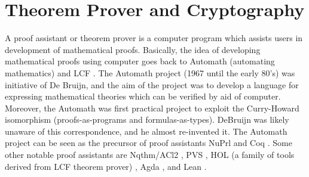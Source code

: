 \chapter{Theorem Prover and Cryptography}
\label{cha:theorem_crypto}
 

A proof assistant or theorem prover is a computer program which assists users in development 
of mathematical proofs. Basically, the idea of 
developing mathematical proofs using computer goes back to Automath (automating mathematics)
\citep{deBruijn1983} and LCF \citep{Milner:1972:IAS:942578.807067}. The 
Automath project (1967 until the early 80's)  was initiative of De Bruijn, and the aim of the project was to 
develop a language for expressing mathematical theories which can be verified by aid of computer.  
Moreover, the Automath was first 
practical project to exploit the Curry-Howard isomorphism (proofs-as-programs and formulas-as-types). 
DeBruijn  was likely unaware of this correspondence, and he almost re-invented it.
The Automath project can be seen as the precursor of
 proof assistants NuPrl \citep{Constable:1986:IMN:10510} and Coq \citep{Bertot:2004:ITP}.  
 Some other notable  proof assistants are 
 Nqthm/ACl2 \citep{507872}, PVS \citep{Owre:1992:PPV:648230.752639},
 HOL (a family of tools derived from LCF theorem prover) \citep{Slind:2008:BOH:1459784.1459792}
 \citep{Harrison:1996:HLT:646184.682934} \citep{Nipkow:2002:IHP},
 Agda \citep{Norell:2008:DTP:1813347.1813352}, and Lean \citep{10.1007/978-3-319-21401-6_26}.


